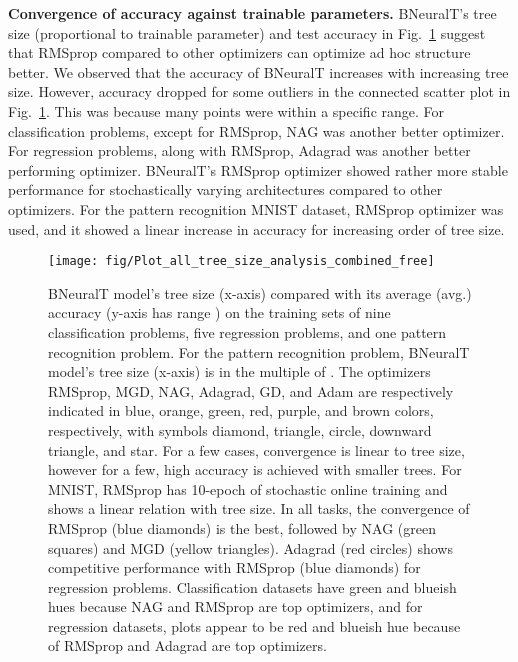 \documentclass[11pt,a4paper]{article}
\begin{document}
    
    \textbf{Convergence of accuracy against trainable parameters.} BNeuralT's tree size (proportional to trainable parameter) and test accuracy in Fig.~\ref{fig:BneuralT_tree_size_vs_acc} suggest that RMSprop compared to other optimizers can optimize ad hoc structure better. We observed that the accuracy of BNeuralT increases with increasing tree size. However, accuracy dropped for some outliers in the connected scatter plot in Fig.~\ref{fig:BneuralT_tree_size_vs_acc}. This was because many points were within a specific range.  For classification problems, except for RMSprop, NAG was another better optimizer. For regression problems, along with RMSprop, Adagrad was another better performing optimizer. BNeuralT's RMSprop optimizer showed rather more stable performance for stochastically varying architectures compared to other optimizers. 
    For the pattern recognition MNIST dataset, RMSprop optimizer was used, and it showed a linear increase in accuracy for increasing order of tree size.
    
    
    \begin{figure}[]
        \centering
        \texttt{[image: fig/Plot\_all\_tree\_size\_analysis\_combined\_free]}
        \caption{BNeuralT model's tree size  (x-axis) compared with its average (avg.) accuracy  (y-axis has range ) on the training sets of nine classification problems, five regression problems, and one pattern recognition problem.  For the pattern recognition problem, BNeuralT model's tree size  (x-axis) is in the multiple of . The optimizers RMSprop, MGD, NAG, Adagrad, GD, and Adam are respectively indicated in blue, orange, green, red, purple, and brown colors, respectively, with symbols diamond, triangle, circle, downward triangle, and star.  For a few cases, convergence is linear to tree size, however for a few, high accuracy is achieved with smaller trees. For MNIST, RMSprop has 10-epoch of stochastic online training and shows a linear relation with tree size. In all tasks, the convergence of RMSprop (blue diamonds) is the best, followed by NAG (green squares) and MGD (yellow triangles). Adagrad (red circles) shows competitive performance with  RMSprop (blue diamonds) for regression problems. Classification datasets have green and blueish hues because NAG and RMSprop are top optimizers, and for regression datasets, plots appear to be red and blueish hue because of RMSprop and Adagrad are top optimizers.
        \label{fig:BneuralT_tree_size_vs_acc}}
        
    \end{figure}
        
\end{document}
